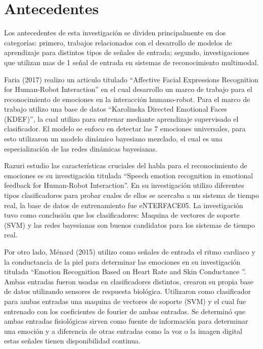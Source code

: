 \documentclass[12pt,oneside]{book}
\begin{document}
\section{Antecedentes}

Los antecedentes de esta investigación se dividen principalmente en dos categorías: primero, trabajos relacionados con el desarrollo de modelos de aprendizaje para distintos tipos de señales de entrada; segundo, investigaciones que utilizan mas de 1 señal de entrada en sistemas de reconocimiento multimodal.


Faria (2017) \citep{faria} realizo un articulo titulado ``Affective Facial Expressions Recognition for Human-Robot Interaction'' en el cual desarrollo un marco de trabajo para el reconocimiento de emociones en la interacción humano-robot. Para el marco de trabajo utilizo una base de datos ``Karolinska Directed Emotional Faces (KDEF)'', la cual utilizo para entrenar mediante aprendizaje supervisado el clasificador. El modelo se enfoco en detectar las 7 emociones universales, para esto utilizaron un modelo dinámico bayesiano mezclado, el cual es una especialización de las redes dinámicas bayesianas.


Razuri \citep{Rzuri2015SpeechER} estudio las características cruciales del habla para el reconocimiento de emociones es su investigación titulada ``Speech emotion recognition in emotional feedback
for Human-Robot Interaction''. En su investigación utilizo diferentes tipos clasificadores para probar cuales de ellos se acercaba a un sistema de tiempo real, la base de datos de entrenamiento fue eNTERFACE05. La investigación tuvo como conclusión que los clasificadores: Maquina de vectores de soporte (SVM) y las redes bayesianas  son buenos candidatos para los sistemas de tiempo real.

Por otro lado, Ménard (2015) \citep{Menard} utilizo como señales de entrada el ritmo cardiaco y la conductancia de la piel para determinar las emociones en su investigación titulada ``Emotion Recognition Based on Heart Rate and Skin Conductance ''. Ambas entradas fueron usadas en clasificadores distintos, crearon su propia base de datos utilizando sensores de respuesta biológica. Utilizaron como clasificador para ambas entradas una maquina de vectores de soporte (SVM) y el cual fue entrenado con los coeficientes de fourier de ambas entradas. Se determin\'o que ambas entradas fisiológicas sirven como fuente de información para determinar una emoción y a diferencia de otras entradas como la voz o la imagen digital estas señales tienen disponibilidad continua.
\end{document}
